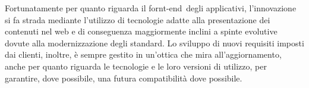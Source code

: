 	Fortunatamente per quanto riguarda il fornt-end\glossario\ degli applicativi, l'innovazione si fa strada mediante l'utilizzo di tecnologie adatte alla presentazione dei contenuti	nel web e di conseguenza maggiormente inclini a spinte evolutive dovute alla modernizzazione degli standard. Lo sviluppo di nuovi requisiti imposti dai clienti, inoltre, è sempre gestito in un'ottica che mira all'aggiornamento, anche per quanto riguarda le tecnologie e le loro versioni di utilizzo, per garantire, dove possibile, una futura compatibilità dove possibile.